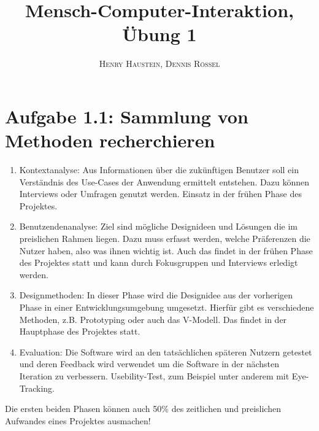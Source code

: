 \documentclass{article}
\title{\textbf{Mensch-Computer-Interaktion, Übung 1}}
\author{\textsc{Henry Haustein}, \textsc{Dennis Rössel}}
\date{}
\begin{document}
	\maketitle
	
	\section*{Aufgabe 1.1: Sammlung von Methoden recherchieren}
	\begin{enumerate}[label=(\alph*)]
		\item Kontextanalyse: Aus Informationen über die zukünftigen Benutzer soll ein Verständnis des Use-Cases der Anwendung ermittelt entstehen. Dazu können Interviews oder Umfragen genutzt werden. Einsatz in der frühen Phase des Projektes.
		\item Benutzendenanalyse: Ziel sind mögliche Designideen und Lösungen die im preislichen Rahmen liegen. Dazu muss erfasst werden, welche Präferenzen die Nutzer haben, also was ihnen wichtig ist. Auch das findet in der frühen Phase des Projektes statt und kann durch Fokusgruppen und Interviews erledigt werden.
		\item Designmethoden: In dieser Phase wird die Designidee aus der vorherigen Phase in einer Entwicklungsumgebung umgesetzt. Hierfür gibt es verschiedene Methoden, z.B. Prototyping oder auch das V-Modell. Das findet in der Hauptphase des Projektes statt.
		\item Evaluation: Die Software wird an den tatsächlichen späteren Nutzern getestet und deren Feedback wird verwendet um die Software in der nächsten Iteration zu verbessern. Usebility-Test, zum Beispiel unter anderem mit Eye-Tracking.
	\end{enumerate}
	Die ersten beiden Phasen können auch 50\% des zeitlichen und preislichen Aufwandes eines Projektes ausmachen!
\end{document}
